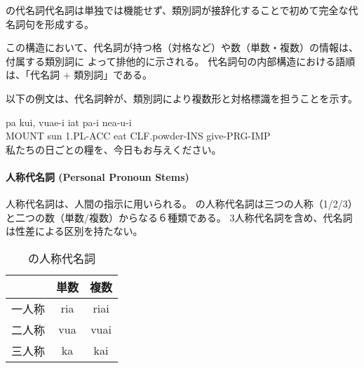 \langname の代名詞代名詞は単独では機能せず、類別詞が接辞化することで初めて完全な代名詞句を形成する。

この構造において、代名詞が持つ格（対格など）や数（単数・複数）の情報は、付属する類別詞に
よって排他的に示される。
代名詞句の内部構造における語順は、「代名詞 + 類別詞」である。

以下の例文は、代名詞幹が、類別詞により複数形と対格標識を担うことを示す。

\begin{exe}
    \ex \gll pa kui, vuae-i iat pa-i nea-u-i \\
        MOUNT sun 1.PL-ACC eat CLF.powder-INS give-PRG-IMP \\
        \glt 私たちの日ごとの糧を、今日もお与えください。
\end{exe}

\paragraph{人称代名詞 (Personal Pronoun Stems)}
人称代名詞は、人間の指示に用いられる。
\langname の人称代名詞は三つの人称（1/2/3）と二つの数（単数/複数）からなる６種類である。
3人称代名詞を含め、代名詞は性差による区別を持たない。

\begin{table}[H]
    \centering
    \begin{tabular}{lcc}
        \toprule
        & 単数 & 複数  \\
        \midrule
        一人称 & ria & riai \\
        二人称 & vua & vuai \\
        三人称 & ka & kai \\
        \bottomrule
    \end{tabular}
    \caption{\centering \langname の人称代名詞}
    \label{tab:pronouns}
\end{table}

